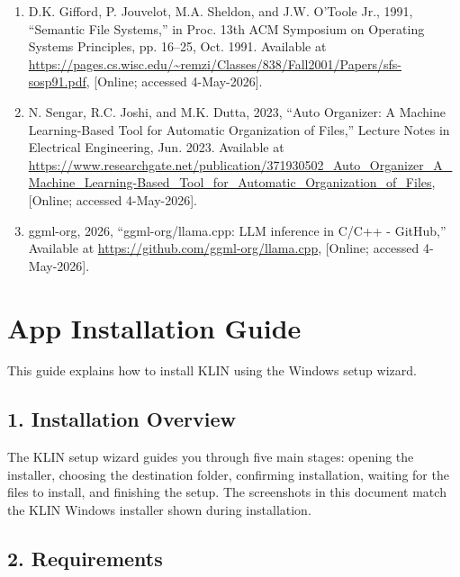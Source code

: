 \documentclass[12pt,oneside,openright,a4paper]{cpe-english-project}
\begin{document}
\begin{enumerate}[label=\arabic*.,leftmargin=0.6in]
\item D.K. Gifford, P. Jouvelot, M.A. Sheldon, and J.W. O'Toole Jr., 1991, ``Semantic File Systems,'' in Proc. 13th ACM Symposium on Operating Systems Principles, pp. 16--25, Oct. 1991. Available at \url{https://pages.cs.wisc.edu/~remzi/Classes/838/Fall2001/Papers/sfs-sosp91.pdf}, [Online; accessed 4-May-2026].
\item N. Sengar, R.C. Joshi, and M.K. Dutta, 2023, ``Auto Organizer: A Machine Learning-Based Tool for Automatic Organization of Files,'' Lecture Notes in Electrical Engineering, Jun. 2023. Available at \url{https://www.researchgate.net/publication/371930502_Auto_Organizer_A_Machine_Learning-Based_Tool_for_Automatic_Organization_of_Files}, [Online; accessed 4-May-2026].
\item ggml-org, 2026, ``ggml-org/llama.cpp: LLM inference in C/C++ - GitHub,'' Available at \url{https://github.com/ggml-org/llama.cpp}, [Online; accessed 4-May-2026].
\end{enumerate}








\section*{App Installation Guide}

This guide explains how to install KLIN using the Windows setup wizard.

\subsection*{1. Installation Overview}

The KLIN setup wizard guides you through five main stages: opening the installer, choosing the destination folder, confirming installation, waiting for the files to install, and finishing the setup. The screenshots in this document match the KLIN Windows installer shown during installation.

\subsection*{2. Requirements}
\end{document}
